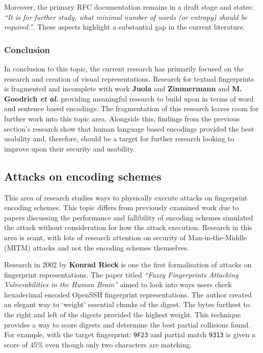 \newpage

Moreover, the primary RFC documentation remains in a draft stage and states: \textit{``It is for further study, what minimal number of words (or entropy) should be required.''}. These aspects highlight a substantial gap in the current literature.

\subsubsection*{Conclusion}

In conclusion to this topic, the current research has primarily focused on the research and creation of visual representations. Research for textual fingerprints is fragmented and incomplete with work \textbf{Juola} and \textbf{Zimmermann} 
\cite{juola1996whole} and \textbf{M. Goodrich \textit{et al.}}\cite{goodrich2006loud} providing meaningful research to build upon in terms of word and sentence based encodings. The fragmentation of this research leaves room for further work into this topic area. Alongside this, findings from the previous section's research show that human language based encodings provided the best usability and, therefore, should be a target for further research looking to improve upon their security and usability.

\subsection{Attacks on encoding schemes}
This area of research studies ways to physically execute attacks on fingerprint encoding schemes. This topic differs from previously examined work due to papers discussing the performance and fallibility of encoding schemes simulated the attack without consideration for how the attack execution. Research in this area is scant, with lots of research attention on security of Man-in-the-Middle (MITM) attacks and not the encoding schemes themselves.

Research in 2002 by \textbf{Konrad Rieck}\cite{rieck2002fuzzy} is one the first formalisation of attacks on fingerprint representations. The paper titled \textit{``Fuzzy Fingerprints Attacking Vulnerabilities in the Human Brain''} aimed to look into ways users check hexadecimal encoded OpenSSH fingerprint representations. The author created an elegant way to `weight' essential chunks of the digest. The bytes furthest to the right and left of the digests provided the highest weight. This technique provides a way to score digests and determine the best partial collisions found. For example, with the target fingerprint: \verb|9F23| and partial match \verb|9313| is given a score of 45\% even though only two characters are matching.

